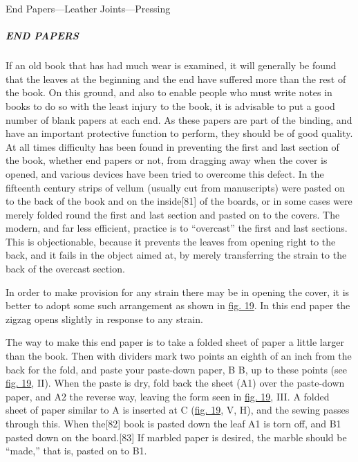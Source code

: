 \documentclass[
]{article}
\begin{document}
End Papers---Leather Joints---Pressing

\hypertarget{end-papers}{%
\subparagraph{END PAPERS}\label{end-papers}}

{If} an old book that has had much wear is examined, it will generally
be found that the leaves at the beginning and the end have suffered more
than the rest of the book. On this ground, and also to enable people who
must write notes in books to do so with the least injury to the book, it
is advisable to put a good number of blank papers at each end. As these
papers are part of the binding, and have an important protective
function to perform, they should be of good quality. At all times
difficulty has been found in preventing the first and last section of
the book, whether end papers or not, from dragging away when the cover
is opened, and various devices have been tried to overcome this defect.
In the fifteenth century strips of vellum (usually cut from manuscripts)
were pasted on to the back of the book and on the
inside{\protect\hypertarget{Page_81}{}{{[}81{]}}} of the boards, or in
some cases were merely folded round the first and last section and
pasted on to the covers. The modern, and far less efficient, practice is
to ``overcast'' the first and last sections. This is objectionable,
because it prevents the leaves from opening right to the back, and it
fails in the object aimed at, by merely transferring the strain to the
back of the overcast section.

In order to make provision for any strain there may be in opening the
cover, it is better to adopt some such arrangement as shown in
\protect\hyperlink{Fig_19}{fig. 19}. In this end paper the zigzag opens
slightly in response to any strain.

The way to make this end paper is to take a folded sheet of paper a
little larger than the book. Then with dividers mark two points an
eighth of an inch from the back for the fold, and paste your paste-down
paper, B B, up to these points (see \protect\hyperlink{Fig_19}{fig. 19},
II). When the paste is dry, fold back the sheet (A1) over the paste-down
paper, and A2 the reverse way, leaving the form seen in
\protect\hyperlink{Fig_19}{fig. 19}, III. A folded sheet of paper
similar to A is inserted at C (\protect\hyperlink{Fig_19}{fig. 19}, V,
H), and the sewing passes through this. When
the{\protect\hypertarget{Page_82}{}{{[}82{]}}} book is pasted down the
leaf A1 is torn off, and B1 pasted down on the
board.{\protect\hypertarget{Page_83}{}{{[}83{]}}} If marbled paper is
desired, the marble should be ``made,'' that is, pasted on to B1.
\end{document}

